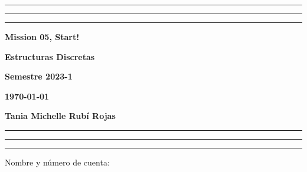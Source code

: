 \documentclass[12pt, a4paper]{exam}
\begin{document}
    \centering
    \hrule \hrule \hrule 
    \vspace{5mm}
    \begin{minipage}[c]{0.8\textwidth}
        \begin{center}
            {\large\textbf{Mission 05, Start!} \par
            \large \textbf{Estructuras Discretas} \par
            \large \textbf{Semestre 2023-1} \par
            \large \textbf{\today}	\par}
        \end{center}
    \end{minipage}

    \vspace{0.2in}
    \noindent
    \textbf{Tania Michelle Rubí Rojas}
    \vspace{2mm}
    \hrule \hrule \hrule 

    \vspace{5mm}
    \noindent
    Nombre y número de cuenta: \hrulefill\

    \vspace{5mm}
    \noindent
    
\end{document}
